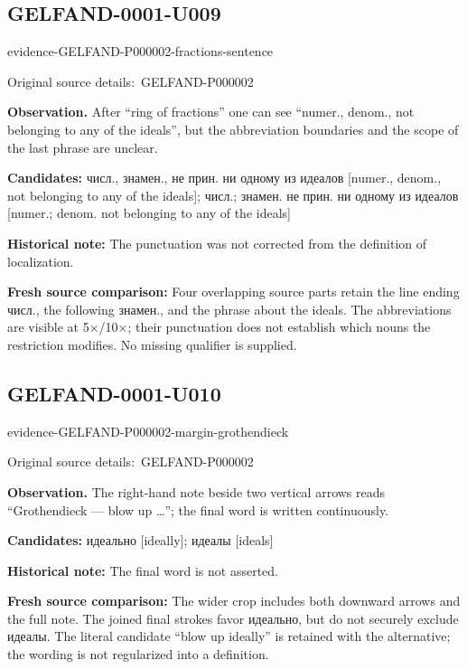 \documentclass[11pt]{article}
\newcommand{\EvidenceBlock}[4]{%
 \par\smallskip\noindent\begin{minipage}{\linewidth}
 \begin{minipage}[t]{.47\linewidth}\vspace{0pt}\centering
 \csname evidence-#1-#2\endcsname\par
 {\scriptsize\SourceCropCaption\ #1}\par
 \end{minipage}\hfill
 \begin{minipage}[t]{.49\linewidth}\vspace{0pt}\raggedright
 {\small\color{orange!65!black}\textbf{#4} #3}\par
 \end{minipage}
 \end{minipage}\par\smallskip}
\newcommand{\SourceCropCaption}{Original source details:}\newcommand{\ReadingCaption}{Uncertain reading.}\newcommand{\IncompleteCaption}{Undeciphered passage.}\newcommand{\DiagramCaption}{Diagram and typed description.}
\begin{document}
\subsection*{GELFAND-0001-U009}
\EvidenceBlock{GELFAND-P000002}{fractions-sentence}{After “ring of fractions” one can see “numer., denom., not belonging to any of the ideals”, but the abbreviation boundaries and the scope of the last phrase are unclear.}{Observation.}
\par\smallskip\noindent\textbf{Candidates: } числ., знамен., не прин. ни одному из идеалов [numer., denom., not belonging to any of the ideals]; числ.; знамен. не прин. ни одному из идеалов [numer.; denom. not belonging to any of the ideals]\par
\par\smallskip\noindent\textbf{Historical note: } The punctuation was not corrected from the definition of localization.\par
\par\smallskip\noindent\textbf{Fresh source comparison: } Four overlapping source parts retain the line ending числ., the following знамен., and the phrase about the ideals. The abbreviations are visible at 5×/10×; their punctuation does not establish which nouns the restriction modifies. No missing qualifier is supplied.\par

\subsection*{GELFAND-0001-U010}
\EvidenceBlock{GELFAND-P000002}{margin-grothendieck}{The right-hand note beside two vertical arrows reads “Grothendieck — blow up …”; the final word is written continuously.}{Observation.}
\par\smallskip\noindent\textbf{Candidates: } идеально [ideally]; идеалы [ideals]\par
\par\smallskip\noindent\textbf{Historical note: } The final word is not asserted.\par
\par\smallskip\noindent\textbf{Fresh source comparison: } The wider crop includes both downward arrows and the full note. The joined final strokes favor идеально, but do not securely exclude идеалы. The literal candidate “blow up ideally” is retained with the alternative; the wording is not regularized into a definition.\par
\end{document}
